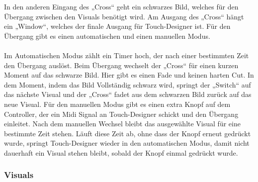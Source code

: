 \documentclass[12pt]{scrartcl}%
\theoremstyle{nonumberplain}
\begin{document}
\noindent In den anderen Eingang des „Cross“ geht ein schwarzes Bild, welches für den Übergang zwischen den Visuals benötigt wird. Am Ausgang des „Cross“ hängt ein „Window“, welches der finale Ausgang für Touch-Designer ist. Für den Übergang gibt es einen automatischen und einen manuellen Modus.
\\\\
Im Automatischen Modus zählt ein Timer hoch, der nach einer bestimmten Zeit den Übergang auslöst. Beim Übergang wechselt der „Cross“ für einen kurzen Moment auf das schwarze Bild. Hier gibt es einen Fade und keinen harten Cut. In dem Moment, indem das Bild Vollständig schwarz wird, springt der „Switch“ auf das nächste Visual und der „Cross“ fadet aus dem schwarzen Bild zurück auf das neue Visual. Für den manuellen Modus gibt es einen extra Knopf auf dem Controller, der ein Midi Signal an Touch-Designer schickt und den Übergang einleitet. Nach dem manuellen Wechsel bleibt das ausgewählte Visual für eine bestimmte Zeit stehen. Läuft diese Zeit ab, ohne dass der Knopf erneut gedrückt wurde, springt Touch-Designer wieder in den automatischen Modus, damit nicht dauerhaft ein Visual stehen bleibt, sobald der Knopf einmal gedrückt wurde. 


\newpage

\subsubsection{Visuals}
\end{document}
